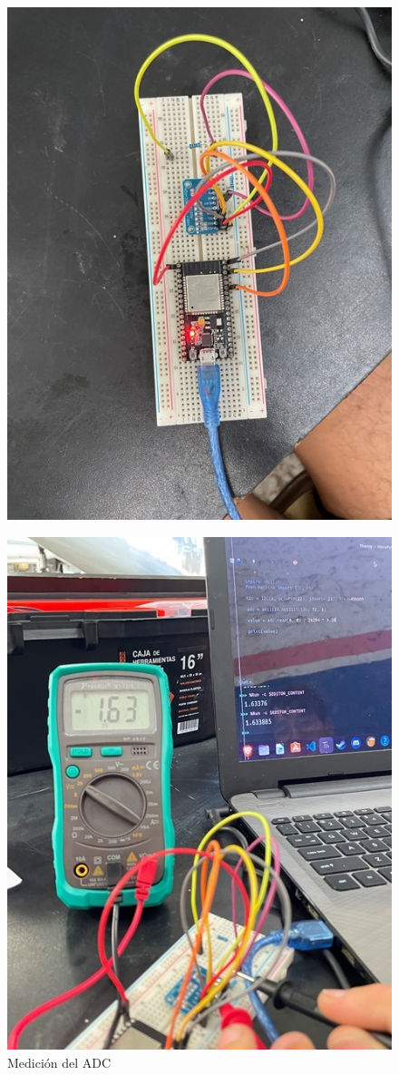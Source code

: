 \begin{figure}[H]
    \centering
    \includegraphics[width=0.65\linewidth]{informes/IMG_7678.jpg}
    \caption{}
\end{figure}

\begin{figure}[H]
    \centering
    \includegraphics[width=0.75\linewidth]{informes/IMG_7684.jpg}
    \caption{Medición del ADC}
\end{figure}


